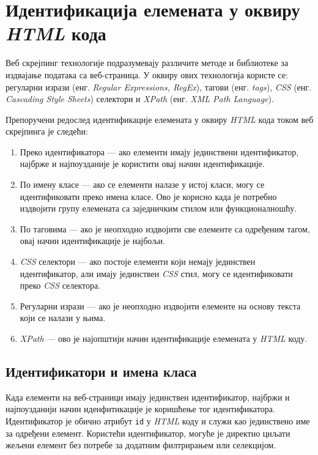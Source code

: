 \documentclass[12pt,oneside]{memoir}
\begin{document}
\section{Идентификација елемената у оквиру \textit{HTML} кода}
Веб скрејпинг технологије подразумевају различите методе и библиотеке за издвајање података са веб-страница. У оквиру ових технологија користе се: регуларни изрази (енг. \textit{Regular Expressions, RegEx}), тагови (енг. \textit{tags}), \textit{CSS} (енг. \textit{Cascading Style Sheets}) селектори и \textit{XPath} \cite{xpath} (енг. \textit{XML Path Language}).

Препоручени редослед идентификације елемената у оквиру \textit{HTML} кода током веб скрејпинга је следећи:

\begin{enumerate}
\item Преко идентификатора --- ако елементи имају јединствени идентификатор, најбрже и најпоузданије је користити овај начин идентификације.
\item По имену класе --- ако се елементи налазе у истој класи, могу се идентификовати преко имена класе. Ово је корисно када је потребно издвојити групу елемената са заједничким стилом или функционалношћу.
\item По таговима --- ако је неопходно издвојити све елементе са одређеним тагом, овај начин идентификације је најбољи.
\item \textit{CSS} селектори --- ако постоје елементи који немају јединствен идентификатор, али имају јединствен \textit{CSS} стил, могу се идентификовати преко \textit{CSS} селектора.
\item Регуларни изрази --- ако је неопходно издвојити елементе на основу текста који се налази у њима.
\item \textit{XPath} --- ово је најопштији начин идентификације елемената у \textit{HTML} коду.
\end{enumerate}

\subsection{Идентификатори и имена класа}
Када елементи на веб-страници имају јединствен идентификатор, најбржи и најпоузданији начин иденфитикације је коришћење тог идентификатора. Идентификатор је обично атрибут \texttt{id} у \textit{HTML} коду и служи као јединствено име за одређени елемент. Користећи идентификатор, могуће је директно циљати жељени елемент без потребе за додатним филтрирањем или селекцијом.
\end{document}
